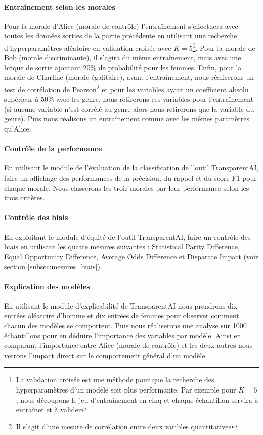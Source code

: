 \documentclass[10pt, french, a4paper]{report}
\begin{document}
\paragraph{Entraînement selon les morales} Pour la morale d'Alice (morale de contrôle) l'entraînement s'effectuera avec toutes les données sorties de la partie précédente en utilisant une recherche d'hyperparamètres aléatoire en validation croisée avec $K=5$\footnote{La validation croisée est une méthode pour que la recherche des hyperparamètres d'un modèle soit plus performante. Par exemple pour $K=5$, nous découpons le jeu d'entraînement en cinq et chaque échantillon servira à entraîner et à valider}. Pour la morale de Bob (morale discriminante), il s'agira du même entraînement, mais avec une brique de sortie ajoutant 20\% de probabilité pour les femmes. Enfin, pour la morale de Charline (morale égalitaire), avant l'entraînement, nous réaliserons un test de corrélation de Pearson\footnote{Il s'agit d'une mesure de corrélation entre deux varibles quantitatives} et pour les variables ayant un coefficient absolu supérieur à 50\% avec les genre, nous retirerons ces variables pour l'entraînement (si aucune variable n'est corrélé au genre alors nous retirerons que la variable du genre). Puis nous réalisons un entraînement comme avec les mêmes paramètres qu'Alice.

\paragraph{Contrôle de la performance} En utilisant le module de l'évaluation de la classification de l'outil TransparentAI, faire un affichage des performances de la précision, du rappel et du score F1 pour chaque morale. Nous classerons les trois morales par leur performance selon les trois critères.

\paragraph{Contrôle des biais} En exploitant le module d'équité de l'outil TransparentAI, faire un contrôle des biais en utilisant les quatre mesures suivantes : Statistical Parity Difference, Equal Opportunity Difference, Average Odds Difference et Disparate Impact (voir section \ref{subsec:mesures_biais}).

\paragraph{Explication des modèles} En utilisant le module d'explicabilité de TransparentAI nous prendrons dix entrées aléatoire d'homme et dix entrées de femmes pour observer comment chacun des modèles se comportent. Puis nous réaliserons une analyse sur 1000 échantillons pour en déduire l'importance des variables par modèle. Ainsi en comparant l'importance entre Alice (morale de contrôle) et les deux autres nous verrons l'impact direct sur le comportement général d'un modèle.
\end{document}

